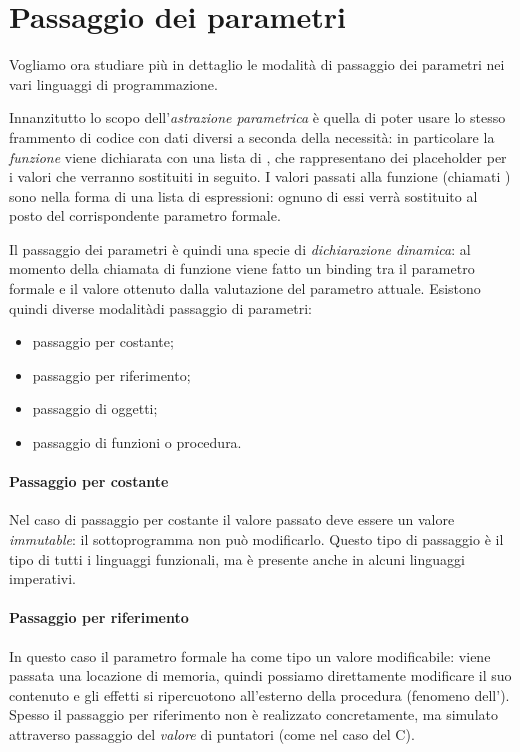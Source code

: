 \section{Passaggio dei parametri}

Vogliamo ora studiare più in dettaglio le modalità di passaggio dei parametri nei vari linguaggi di programmazione.

Innanzitutto lo scopo dell'\emph{astrazione parametrica} è quella di poter usare lo stesso frammento di codice con dati diversi a seconda della necessità: in particolare la \emph{funzione} viene dichiarata con una lista di , che rappresentano dei placeholder per i valori che verranno sostituiti in seguito. I valori passati alla funzione (chiamati ) sono nella forma di una lista di espressioni: ognuno di essi verrà sostituito al posto del corrispondente parametro formale.

Il passaggio dei parametri è quindi una specie di \emph{dichiarazione dinamica}: al momento della chiamata di funzione viene fatto un binding tra il parametro formale e il valore ottenuto dalla valutazione del parametro attuale. Esistono quindi diverse modalitàdi passaggio di parametri:
\begin{itemize}
    \item passaggio per costante;
    \item passaggio per riferimento;
    \item passaggio di oggetti;
    \item passaggio di funzioni o procedura.
\end{itemize}

\paragraph{Passaggio per costante} Nel caso di passaggio per costante il valore passato deve essere un valore \emph{immutable}: il sottoprogramma non può modificarlo. Questo tipo di passaggio è il tipo di tutti i linguaggi funzionali, ma è presente anche in alcuni linguaggi imperativi.

\paragraph{Passaggio per riferimento} In questo caso il parametro formale ha come tipo un valore modificabile: viene passata una locazione di memoria, quindi possiamo direttamente modificare il suo contenuto e gli effetti si ripercuotono all'esterno della procedura (fenomeno dell'). Spesso il passaggio per riferimento non è realizzato concretamente, ma simulato attraverso passaggio del \emph{valore} di puntatori (come nel caso del C).

